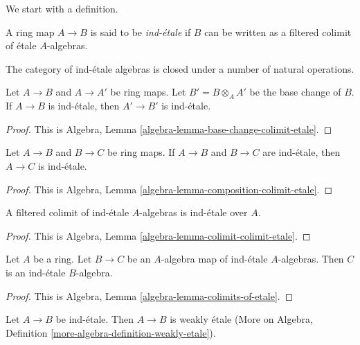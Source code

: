 \noindent
We start with a definition.

\begin{definition}
\label{definition-ind-etale}
A ring map $A \to B$ is said to be {\it ind-\'etale} if $B$ can be written
as a filtered colimit of \'etale $A$-algebras.
\end{definition}

\noindent
The category of ind-\'etale algebras is closed under a number of natural
operations.

\begin{lemma}
\label{lemma-base-change-ind-etale}
Let $A \to B$ and $A \to A'$ be ring maps. Let $B' = B \otimes_A A'$
be the base change of $B$.
If $A \to B$ is ind-\'etale, then $A' \to B'$ is ind-\'etale.
\end{lemma}

\begin{proof}
This is Algebra, Lemma \ref{algebra-lemma-base-change-colimit-etale}.
\end{proof}

\begin{lemma}
\label{lemma-composition-ind-etale}
Let $A \to B$ and $B \to C$ be ring maps. If $A \to B$ and $B \to C$
are ind-\'etale, then $A \to C$ is ind-\'etale.
\end{lemma}

\begin{proof}
This is Algebra, Lemma \ref{algebra-lemma-composition-colimit-etale}.
\end{proof}

\begin{lemma}
\label{lemma-ind-ind-etale}
A filtered colimit of ind-\'etale $A$-algebras is ind-\'etale over $A$.
\end{lemma}

\begin{proof}
This is Algebra, Lemma \ref{algebra-lemma-colimit-colimit-etale}.
\end{proof}

\begin{lemma}
\label{lemma-ind-etale-permanence}
Let $A$ be a ring. Let $B \to C$ be an $A$-algebra map of ind-\'etale
$A$-algebras. Then $C$ is an ind-\'etale $B$-algebra.
\end{lemma}

\begin{proof}
This is Algebra, Lemma \ref{algebra-lemma-colimits-of-etale}.
\end{proof}

\begin{lemma}
\label{lemma-ind-etale-implies}
Let $A \to B$ be ind-\'etale. Then $A \to B$ is weakly \'etale
(More on Algebra, Definition \ref{more-algebra-definition-weakly-etale}).
\end{lemma}

